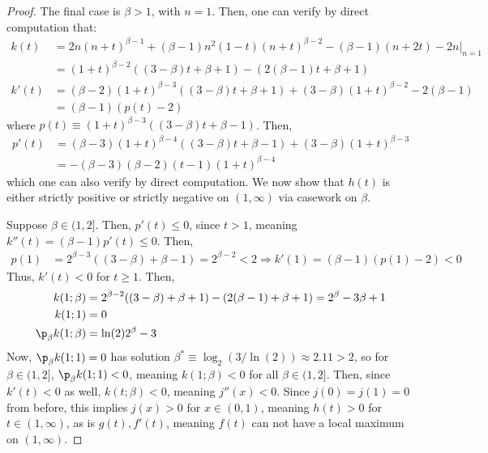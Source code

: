 \documentclass[11pt]{article}
\begin{document}
\begin{proof}
The final case is $\beta > 1$, with $n=1$. Then, one can verify by direct computation that:
\begin{align*}
    k(t)&=2n(n+t)^{\beta -1}+(\beta-1)n^2 (1-t)(n+t)^{\beta-2}-(\beta-1)(n+2t)-2n\bigg|_{n=1}\\
    &=(1+t)^{\beta-2}((3-\beta)t+\beta+1)-(2(\beta-1)t+\beta+1)\\
    k'(t)&=(\beta-2)(1+t)^{\beta-3}((3-\beta)t+\beta+1)+(3-\beta)(1+t)^{\beta-2}-2(\beta-1)\\
    &=(\beta-1)(p(t)-2)
\end{align*}
where $p(t)\equiv (1+t)^{\beta-3}((3-\beta)t+\beta-1)$. Then,
\begin{align*}
    p'(t)&=(\beta-3)(1+t)^{\beta-4}((3-\beta)t+\beta-1)+(3-\beta)(1+t)^{\beta-3}\\
    &=-(\beta-3)(\beta-2)(t-1)(1+t)^{\beta-4}
\end{align*}
which one can also verify by direct computation.
We now show that $h(t)$ is either strictly positive or strictly negative on $(1,\infty)$ via casework on $\beta$. 

Suppose $\beta \in (1,2]$. Then, $p'(t)\leq 0$, since $t> 1$, meaning $k''(t)=(\beta-1)p'(t)\leq 0$. Then,
\begin{align*}
    p(1)&=2^{\beta-3}((3-\beta)+\beta-1)=2^{\beta -2 }<2\Rightarrow k'(1)=(\beta-1)(p(1)-2)<0
\end{align*}
Thus, $k'(t)<0$ for $t\geq 1$. Then,
\begin{align*}
    k(1;\beta )&=2^{\beta-2}((3-\beta)+\beta+1)-(2(\beta-1)+\beta+1)=2^\beta-3\beta+1\\
    k(1;1)&=0\\
    \p_\beta k(1;\beta)&=\ln(2)2^{\beta }-3
\end{align*}
Now, $\p_\beta k(1;1)=0$ has solution $\beta^*\equiv \log_2(3/\ln(2))\approx 2.11>2$, so for $\beta \in (1,2]$, $\p_\beta k(1;1)<0$, 
meaning $k(1;\beta)<0$ for all $\beta \in (1,2]$. Then, since $k'(t)<0$ as well, $k(t;\beta)<0$, meaning $j''(x)<0$. Since $j(0)=j(1)=0$ from before, this implies $j(x)>0$ for $x\in (0,1)$, meaning $h(t)>0$ for $t\in (1,\infty)$, as is $g(t),f'(t)$, meaning $f(t)$ can not have a local maximum on $(1,\infty)$. 


\end{proof}
\end{document}
